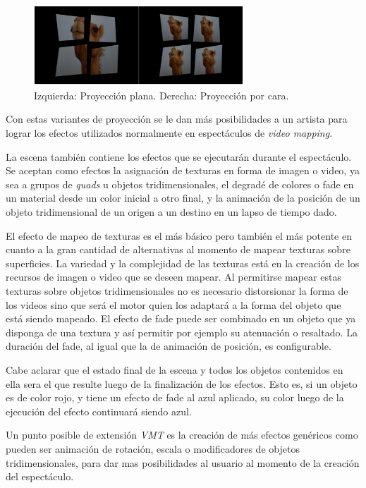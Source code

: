 \begin{figure}[H]
  \centering
    \includegraphics[width=0.7\textwidth]{./Cap5_vmt/vmtengine-maping.png}
  \caption{Izquierda: Proyección plana. Derecha: Proyección por cara.}
  \label{fig:VMT-Projection}
\end{figure}

Con estas variantes de proyección se le dan más posibilidades a un artista para lograr los efectos utilizados normalmente en espectáculos de \emph{video mapping}.

La escena también contiene los efectos que se ejecutarán durante el espectáculo. Se aceptan como efectos la asignación de texturas en forma de imagen o video, ya sea a grupos de \emph{quads} u objetos tridimensionales, el degradé de colores o fade en un material desde un color inicial a otro final, y la animación de la posición de un objeto tridimensional de un origen a un destino en un lapso de tiempo dado.

El efecto de mapeo de texturas es el más básico pero también el más potente en cuanto a la gran cantidad de alternativas al momento de mapear texturas sobre superficies. La variedad y la complejidad de las texturas está en la creación de los recursos de imagen o video que se deseen mapear. Al permitirse mapear estas texturas sobre objetos tridimensionales no es necesario distorsionar la forma de los videos sino que será el motor quien los adaptará a la forma del objeto que está siendo mapeado. El efecto de fade puede ser combinado en un objeto que ya disponga de una textura y así permitir por ejemplo su atenuación o resaltado. La duración del fade, al igual que la de animación de posición, es configurable.

Cabe aclarar que el estado final de la escena y todos los objetos contenidos en ella sera el que resulte luego de la finalización de los efectos. Esto es, si un objeto es de color rojo, y tiene un efecto de fade al azul aplicado, su color luego de la ejecución del efecto continuará siendo azul.

Un punto posible de extensión \emph{VMT} es la creación de más efectos genéricos como pueden ser animación de rotación, escala o modificadores de objetos tridimensionales, para dar mas posibilidades al usuario al momento de la creación del espectáculo.

